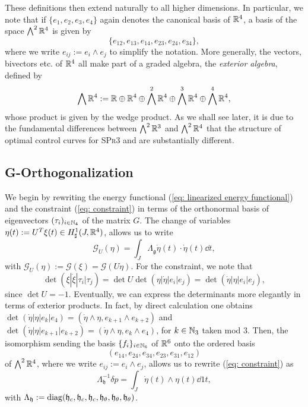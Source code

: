 These definitions then extend naturally to all higher dimensions. In particular, we note that if $\{e_1, e_2, e_3, e_4\}$ again denotes the canonical basis of $\mathbb{R}^4$, a basis of the space $\bigwedge^2 \mathbb{R}^4$ is given by
\begin{equation}
\{e_{12}, e_{13}, e_{14}, e_{23}, e_{24}, e_{34}\},
\end{equation}
where we write $e_{ij} := e_i \wedge e_j$ to simplify the notation. More generally, the vectors, bivectors etc. of $\mathbb{R}^4$ all make part of a graded algebra, the \emph{exterior algebra}, defined by
\begin{equation}
\bigwedge \mathbb{R}^4 := \mathbb{R} \oplus \mathbb{R}^4 \oplus \bigwedge^2\mathbb{R}^4 \oplus \bigwedge^3 \mathbb{R}^4 \oplus \bigwedge^4 \mathbb{R}^4,
\end{equation}
whose product is given by the wedge product. As we shall see later, it is due to the fundamental differences between $\bigwedge^2 \mathbb{R}^3$ and $\bigwedge^2 \mathbb{R}^4$ that the structure of optimal control curves for \textsc{SPr3} and \spr are substantially different.


\subsection{G-Orthogonalization}
We begin by rewriting the energy functional (\ref{eq: linearized energy functional}) and the constraint (\ref{eq: constraint}) in terms of the orthonormal basis of eigenvectors $(\tau_i)_{i \in \mathbb{N}_4}$ of the matrix $G$. The change of variables $\eta(t) := U^T \xi(t) \in H_{\sharp}^{1}(J, \mathbb{R}^4)$, allows us to write
\begin{equation}
\label{eq: G-orth energy functional}
\mathcal{G}_{U}(\eta) = \int_{J} \Lambda_{\mathfrak{g}} \dot{\eta}(t) \cdot \dot{\eta}(t) \dd t,
\end{equation}
with $\mathcal{G}_{U}(\eta) := \mathcal{G}(\xi) = \mathcal{G}(U \eta)$. For the constraint, we note that
\begin{equation}
\det(\xi |\dot{\xi} | \tau_i | \tau_j) =  \det U \det (\eta | \dot{\eta} | e_i | e_j) = \det(\dot{\eta} | \eta | e_i |e_j),
\end{equation}
since $\det U = -1$. Eventually, we can express the determinants more elegantly in terms of exterior products. In fact, by direct calculation one obtains $\det(\dot{\eta} | \eta | e_k |e_4) = (\dot{\eta} \wedge \eta, e_{k + 1} \wedge e_{k+2})$ and $\det(\dot{\eta} |\eta | e_{k + 1} |e_{k + 2}) = (\dot{\eta} \wedge \eta, e_k \wedge e_4)$, for $k \in \mathbb{N}_3$ taken mod 3. Then, the isomorphism sending the basis $\{f_i\}_{i \in \mathbb{N}_6}$ of $\mathbb{R}^6$ onto the ordered basis 
\begin{equation}
\label{eq: basis of bivectors}
(e_{14}, e_{24}, e_{34}, e_{23}, e_{31}, e_{12})
\end{equation}
of $\bigwedge^2 \mathbb{R}^4$, where we write $e_{ij} := e_i \wedge e_j$, allows us to rewrite (\ref{eq: constraint}) as
\begin{equation}
\label{eq: G-orth constraint}
\Lambda_{\mathfrak{h}}^{-1} \delta p = \int_{J} \dot{\eta}(t) \wedge\eta(t) \dd 1t,
\end{equation}
with $\Lambda_{\mathfrak{h}} := \operatorname{diag}(\mathfrak{h}_{c}, \mathfrak{h}_{c}, \mathfrak{h}_{c}, \mathfrak{h}_{\theta}, \mathfrak{h}_{\theta}, \mathfrak{h}_{\theta})$.

